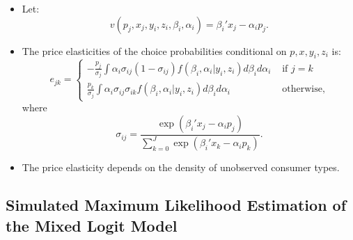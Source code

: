 \documentclass[
]{book}
\providecommand{\tightlist}{%
  \setlength{\itemsep}{0pt}\setlength{\parskip}{0pt}}
\begin{document}
\begin{itemize}
\tightlist
\item
  Let:
  \begin{equation}
  v(p_j, x_j, y_i, z_i, \beta_i, \alpha_i) = \beta_i' x_j - \alpha_i p_j.
  \end{equation}
\item
  The price elasticities of the choice probabilities conditional on \(p, x, y_i, z_i\) is:
  \begin{equation}
  e_{jk} = 
  \begin{cases}
  -\frac{p_j}{\sigma_j} \int \alpha_i \sigma_{ij}(1 - \sigma_{ij})f(\beta_i, \alpha_i|y_i, z_i) d\beta_i d\alpha_i &\text{   if   } j = k\\
  \frac{p_k}{\sigma_j} \int \alpha_i \sigma_{ij} \sigma_{ik} f(\beta_i, \alpha_i|y_i, z_i) d\beta_i d\alpha_i &\text{   otherwise},
  \end{cases} 
  \end{equation}
  where
  \begin{equation}
  \sigma_{ij} = \frac{\exp(\beta_i'x_j - \alpha_i p_j)}{\sum_{k = 0}^J \exp(\beta_i'x_k - \alpha_i p_k)}.
  \end{equation}
\item
  The price elasticity depends on the density of unobserved consumer types.
\end{itemize}

\hypertarget{simulated-maximum-likelihood-estimation-of-the-mixed-logit-model}{%
\subsection{Simulated Maximum Likelihood Estimation of the Mixed Logit Model}\label{simulated-maximum-likelihood-estimation-of-the-mixed-logit-model}}
\end{document}
